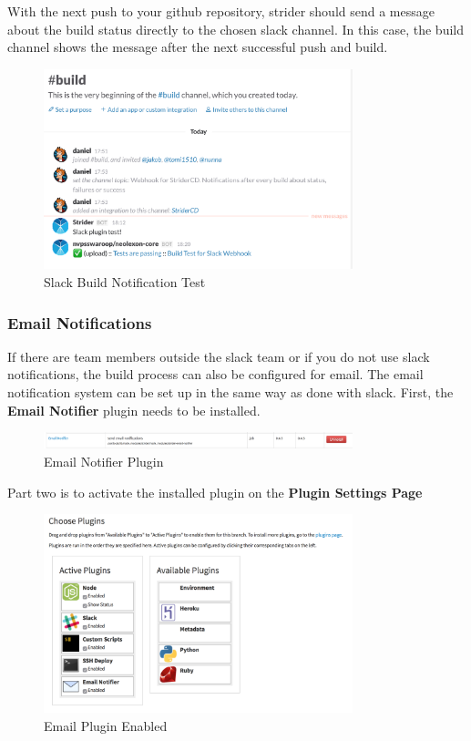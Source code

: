 With the next push to your github repository, strider should send a message about the build status directly to the chosen slack channel.
In this case, the build channel shows the message after the next successful push and build.

\begin{figure}[h!]
  \centering
  \includegraphics[width=0.8\textwidth]{images/slack_buildtest.png}
  \caption{Slack Build Notification Test}
\end{figure}

\subsubsection{Email Notifications}
If there are team members outside the slack team or if you do not use slack notifications, the build process can also be configured
for email. The email notification system can be set up in the same way as done with slack. First, the \textbf{Email Notifier}
plugin needs to be installed.

\begin{figure}[h!]
  \centering
  \includegraphics[width=0.8\textwidth]{images/email_notifier.png}
  \caption{Email Notifier Plugin}
\end{figure}

Part two is to activate the installed plugin on the \textbf{Plugin Settings Page}

\begin{figure}[h!]
  \centering
  \includegraphics[width=0.8\textwidth]{images/email_active.png}
  \caption{Email Plugin Enabled}
\end{figure}

